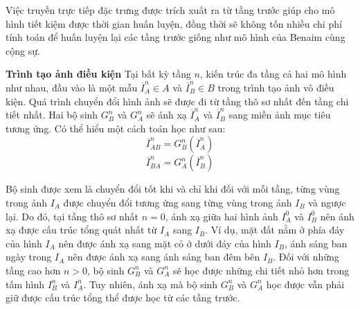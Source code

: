 \documentclass[12pt]{report}%
\begin{document}
Việc truyền trực tiếp đặc trưng được trích xuất ra từ tầng trước giúp cho mô hình tiết kiệm được thời gian huấn luyện, đồng thời sẽ không tốn nhiều chi phí tính toán để huấn luyện lại các tầng trước giống như mô hình của Benaim cùng cộng sự.


\textbf{Trình tạo ảnh điều kiện} \quad Tại bất kỳ tầng $n$, kiến trúc đa tầng cả hai mô hình như nhau, đầu vào là  một mẫu $\overline{I}_A ^n \in A$ và $\overline{I}_B ^n \in B$ trong trình tạo ảnh vô điều kiện. Quá trình chuyển đổi hình ảnh sẽ được đi từ tầng thô sơ nhất đến tầng chi tiết nhất. Hai bộ sinh $G_B ^n$ và $G_A ^n$ sẽ ánh xạ $\overline I _A^n$ và $\overline I _B^n$ sang miền ảnh mục tiêu tương ứng. Có thể hiểu một cách toán học như sau: 
\begin{equation}\label{mix_g_b}
    \overline I _{AB}^n = G_B^n\left( {\overline I _A^n} \right)
\end{equation}
\begin{equation}\label{mix_g_a}
    \overline I _{BA}^n = G_A^n\left( {\overline I _B^n} \right)
\end{equation}

Bộ sinh được xem là chuyển đổi tốt khi và chỉ khi đối với mỗi tầng, từng vùng trong ảnh $I_A$ được chuyển đổi tương ứng sang từng vùng trong ảnh $I_B$ và ngược lại. Do đó, tại tầng thô sơ nhất $n=0$, ánh xạ giữa hai hình ảnh $I_A ^0$ và $I_B ^0$ nên ánh xạ được cấu trúc tổng quát nhất từ $I_A$ sang $I_B$. Ví dụ, mặt đất nằm ở phía đáy của hình $I_A$ nên được ánh xạ sang mặt cỏ ở dưới đáy của hình $I_B$, ánh sáng ban ngày trong $I_A$ nên được ánh xạ sang ánh sáng ban đêm bên $I_B$. Đối với những tầng cao hơn $n>0$, bộ sinh $G_B ^n$ và $G_A ^n$ sẽ học được những chi tiết nhỏ hơn trong tấm hình $I_B ^n$ và $I_A ^n$. Tuy nhiên, ánh xạ mà bộ sinh $G_B ^n$ và $G_A ^n$ học được vẫn phải giữ được cấu trúc tổng thể được học từ các tầng trước. 


\clearpage
\end{document}
